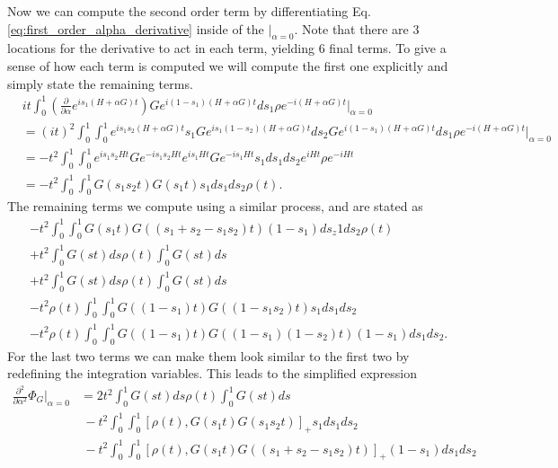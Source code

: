 \documentclass{article}
\newcommand{\parens}[1]{\left( #1 \right)}
\newcommand{\brackets}[1]{\left[ #1 \right]}
\begin{document}
Now we can compute the second order term by differentiating Eq. \eqref{eq:first_order_alpha_derivative} inside of the $\big|_{\alpha = 0}$. Note that there are 3 locations for the derivative to act in each term, yielding 6 final terms. To give a sense of how each term is computed we will compute the first one explicitly and simply state the remaining terms.
\begin{align}
    &i t\int_0^1 \parens{\frac{\partial}{\partial \alpha} e^{i s_1 (H+ \alpha G)t}} G e^{i(1-s_1)(H+\alpha G)t} ds_1 \rho e^{-i (H+\alpha G)t} \bigg|_{\alpha=0} \\
    &= (it)^2 \int_0^1 \int_0^1 e^{i s_1 s_2 (H+\alpha G)t} s_1 G e^{i s_1 (1-s_2) (H+\alpha G)t} ds_2 G e^{i(1-s_1) (H+\alpha G)t} ds_1 \rho e^{-i(H+\alpha G) t} \bigg|_{\alpha=0} \\
    &= -t^2 \int_0^1 \int_0^1 e^{i s_1 s_2 H t} G e^{-i s_1 s_2 H t} e^{i s_1 H t} G e^{-i s_1 H t} s_1 ds_1 ds_2 e^{i H t} \rho e^{-i H t} \\
    &= -t^2 \int_0^1 \int_0^1 G(s_1 s_2 t) G(s_1 t) s_1 ds_1 ds_2 \rho(t). 
\end{align}
The remaining terms we compute using a similar process, and are stated as
\begin{align}
    & -t^2 \int_0^1 \int_0^1 G(s_1 t) G((s_1 + s_2 - s_1 s_2) t) (1-s_1) ds_z1 ds_2 \rho (t) \\
    & +t^2 \int_0^1 G(st) ds \rho(t) \int_0^1 G(st) ds \\
    & +t^2 \int_0^1 G(st) ds \rho(t) \int_0^1 G(st) ds \\
    & -t^2 \rho(t) \int_0^1 \int_0^1 G((1-s_1)t) G((1-s_1 s_2) t) s_1 ds_1 ds_2 \\
    & -t^2 \rho(t) \int_0^1 \int_0^1 G((1-s_1)t) G((1-s_1)(1 - s_2) t) (1-s_1) ds_1 ds_2.
\end{align}
For the last two terms we can make them look similar to the first two by redefining the integration variables. This leads to the simplified expression
\begin{align}
    \frac{\partial^2}{\partial \alpha^2} \Phi_G \bigg|_{\alpha = 0} &= 2 t^2 \int_0^1 G(st) ds \rho(t) \int_0^1 G(st) ds \label{eq:second_order_duhamel_one} \\
    &~ - t^2 \int_0^1 \int_0^1 \brackets{\rho(t) , G(s_1 t) G(s_1 s_2 t)}_+ s_1 ds_1 ds_2 \label{eq:second_order_duhamel_two}\\
    &~ - t^2 \int_0^1 \int_0^1 \brackets{ \rho(t), G(s_1 t) G((s_1 + s_2 - s_1 s_2) t) }_+ (1-s_1) ds_1 ds_2 \label{eq:second_order_duhamel_three}
\end{align}
\end{document}
